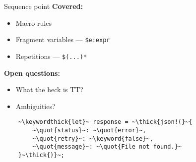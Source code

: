 \documentclass[usepdftitle=false]{beamer}
\newcommand{\thick}[1]{\contourlength{0.16pt}\contour[10]{black}{#1}}
\newcommand{\slantbox}[2][.5]
  {%
    \mbox
      {%
        \sbox{\foobox}{#2}%
        \hskip\wd\foobox
        \pdfsave
        \pdfsetmatrix{1 0 #1 1}%
        \llap{\usebox{\foobox}}%
        \pdfrestore
      }%
  }
\newcommand{\backslantbox}[2][.5]
  {%
    \mbox
      {%
        \sbox{\foobox}{#2}%
        \hskip\wd\foobox
        \pdfsave
        \pdfsetmatrix{-1 0 #1 1}%
        \llap{\usebox{\foobox}}%
        \pdfrestore
      }%
  }
\newcommand{\openquote}{\backslantbox[.2]{\hspace{11pt}''\hspace{-11pt}}}
\newcommand{\closequote}{\slantbox[-.2]{\hspace{2pt}''\hspace{-2pt}}}
\newcommand{\blackquote}[1]{\openquote#1\closequote}
\newcommand{\quot}[1]{{\color{redish}\blackquote{#1}}}
\newcommand{\keyword}[1]{\color{greenish}#1}
\newcommand{\keywordthick}[1]{\color{greenish}\contourlength{0.20pt}\contour[10]{greenish}{#1}}
\begin{document}
\begin{frame}[fragile]{Sequence point}
  \setlength{\leftmargini}{40pt}
  \vspace{10pt}
  \textbf{\large Covered:}
  \begin{itemize}[label=\footnotesize{},labelsep=10pt]
  \vspace{-4pt}
  \item Macro rules
  \vspace{-4pt}
  \item Fragment variables --- \texttt{\$e:expr}
  \vspace{-4pt}
  \item Repetitions --- \texttt{\$(...)*}
  \end{itemize}
  \vspace{10pt}
  \textbf{\large Open questions:}
  \begin{itemize}[label=\footnotesize{},labelsep=10pt]
  \vspace{-4pt}
  \item What the heck is TT?
  \vspace{-4pt}
  \item Ambiguities?
  \end{itemize}
\end{frame}

\begin{frame}[fragile]
  \begin{verbatim}
    ~\keywordthick{let}~ response = ~\thick{json!(}~{
        ~\quot{status}~: ~\quot{error}~,
        ~\quot{retry}~: ~\keyword{false}~,
        ~\quot{message}~: ~\quot{File not found.}~
    }~\thick{)}~;
  \end{verbatim}
\end{frame}
\end{document}
